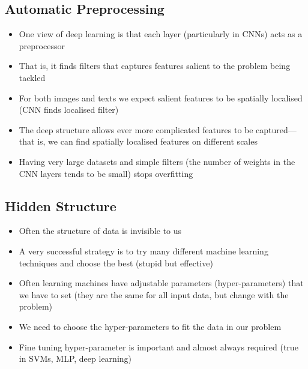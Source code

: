 
\begin{slide}
\section[-2]{Automatic Preprocessing}

\begin{PauseHighLight}
  \begin{itemize}
  \item One view of deep learning is that each layer (particularly in
    CNNs) acts as a preprocessor\pause
  \item That is, it finds filters that captures features salient to
    the problem being tackled\pause
  \item For both images and texts we expect salient features to be
    spatially localised\pause{} (CNN finds localised filter)\pauseb 
  \item The deep structure allows ever more complicated features to be
    captured---that is, we can find spatially localised features on
    different scales\pause
  \item Having very large datasets and simple filters (the number of
    weights in the CNN layers tends to be small) stops
    overfitting\pause
  \end{itemize}
\end{PauseHighLight}

\end{slide}




\Outline %

\begin{slide}
  \section{Hidden Structure}

  \begin{PauseHighLight}
    \begin{itemize}
    \item Often the structure of data is invisible to us\pause
    \item A very successful strategy is to try many different machine
      learning techniques and choose the best\pause{} (stupid but
      effective)\pauseb
    \item Often learning machines have adjustable parameters
      (hyper-parameters) that we have to set (they are the same for
      all input data, but change with the problem)\pause
    \item We need to choose the hyper-parameters to fit the data in
      our problem\pause
    \item Fine tuning hyper-parameter is important\pause{} and almost always
      required (true in SVMs, MLP, deep learning)\pauseb
    \end{itemize}
  \end{PauseHighLight}

\end{slide}

